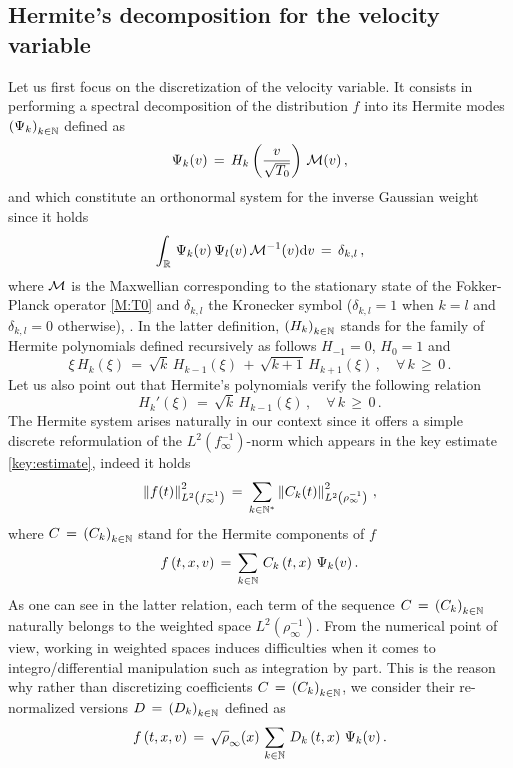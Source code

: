 \documentclass[11pt]{amsart}
\numberwithin{equation}{section}
\numberwithin{figure}{section}
\begin{document}
\subsection{Hermite's decomposition for the velocity variable}
Let us first focus on the discretization of the velocity variable. It consists in performing a spectral decomposition of the distribution $f$ into its Hermite modes $\left(\Psi_k\right)_{k\in{\mathbb N}}$ defined as
\[
\Psi_{k}(v)\,=\, H_{k}\left(\frac{v}{\sqrt{T_0}}\right)\,{\mathcal M}(v)\,,
\]
and which constitute an orthonormal system for the inverse Gaussian weight since it holds
\[
\int_{{\mathbb R}}\,
\Psi_{k}(v)\,\Psi_{l}(v)\,{\mathcal M}^{-1}(v)\mathrm{d} v
\,=\,
\delta_{k,l}\,,
\]
where ${\mathcal M}$ is the Maxwellian corresponding to the stationary state of
the Fokker-Planck operator \eqref{M:T0} and $\delta_{k,l}$ the Kronecker symbol ($\delta_{k,l}=1$ when $k=l$ and
$\delta_{k,l}=0$ otherwise), . In the latter definition, $
\displaystyle
\left(
H_{k}
\right)_{k\in{\mathbb N}} 
$ stands for the family of Hermite polynomials defined recursively as follows
$H_{-1}=0$, $H_{0}=1$ and
\[
\xi\,H_{k}(\xi)\,=\,
\sqrt{k}\,H_{k-1}(\xi)
        \,+\,
        \sqrt{k+1}\,H_{k+1}(\xi)
\,,\quad\forall\, k\,\geq\,0\,.
\]
Let us also point out that Hermite's polynomials verify the following relation
\[
H_k'(\xi)\,=\,\sqrt{k}\,H_{k-1}(\xi)\,,\quad\forall\, k\,\geq\,0\,.
\]
The Hermite system arises naturally in our context since it offers a simple discrete reformulation of the $L^2\left(f_{\infty}^{-1}\right)$-norm which appears in the key estimate \eqref{key:estimate}, indeed it holds
\[
\left\|f(t)\right\|^2_{L^2\left(f_{\infty}^{-1}\right)}
\,=\,
\sum_{k\in{\mathbb N}^*}
\left\|C_k(t)\right\|^2_{L^2\left(\rho_{\infty}^{-1}\right)}\,,
\]
where $
C\,=\,
\left(
C_{k}
\right)_{k\in{\mathbb N}}
$ stand for the Hermite components of $f$
\begin{equation*}
	f\left(t,x,v\right)
	\,=\,
	\sum_{k\in{\mathbb N}}\,
	C_{k}
	\left(t,x
	\right)\,\Psi_{k}(v)\,.
\end{equation*}
As one can see in the latter relation, each term of the sequence $
C\,=\,
\left(
C_{k}
\right)_{k\in{\mathbb N}}
$ naturally belongs to the weighted space $L^2\left(\rho_{\infty}^{-1}\right)$. From the numerical point of view, working in weighted spaces induces difficulties when it comes to integro/differential manipulation such as integration by part. This is the reason why rather than discretizing coefficients $
C\,=\,
\left(
C_{k}
\right)_{k\in{\mathbb N}}
$, we consider their re-normalized versions $
D\,=\,
\left(
D_{k}
\right)_{k\in{\mathbb N}}
$ defined as 
\begin{equation}
  \label{f:decomp}
	f\left(t,x,v\right)
	\,=\,\sqrt\rho_\infty(x)\,
	\sum_{k\in{\mathbb N}}\,
	D_{k}
	\left(t,x
	\right)\,\Psi_{k}(v)\,.
\end{equation}
\end{document}

